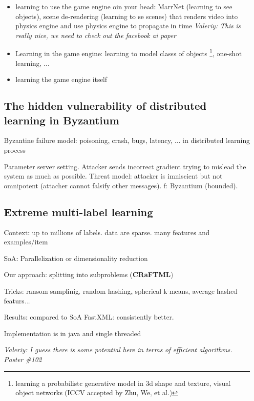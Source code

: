 \documentclass[11pt,oneside,a4paper]{scrartcl}
\newcommand{\valeriy}[1]{{\color{blue}\textit{Valeriy: #1}}}
\begin{document}
\begin{itemize}
\item learning to use the game engine oin your head: MarrNet (learning
  to see objects), scene de-rendering (learning to se scenes) that
  renders video into physics engine and use physics engine to
  propagate in time
  \valeriy{This is really nice, we need to check out the facebook ai paper}
  
\item Learning in the game engine: learning to model classs of objects \footnote{ learning a probabilistc generative
  model in 3d shape and texture, visual object networks (ICCV accepted
  by Zhu, We, et al.) }, one-shot learning, ...
  
\item learning the game engine itself
\end{itemize}

\subsection{The hidden vulnerability of distributed learning in Byzantium \cite{mhamdi18a}}
\label{sec:hidd-vuln-distr}

Byzantine failure model: poisoning, crash, bugs, latency, ... in
distributed learning process

Parameter server setting. Attacker sends incorrect gradient trying to
mislead the system as much as possible. Threat model: attacker is imniscient but not
omnipotent (attacher cannot falsify other messages). f: Byzantium (bounded). 

\subsection{Extreme multi-label learning}
\label{sec:extreme-multi-label}

Context: up to millions of labels. data are sparse. many features and
examples/item

SoA: Parallelization or dimensionality reduction

Our approach: splitting into subproblems (\textbf{CRaFTML})

Tricks: ransom samplinig, random hashing, spherical k-means, average
hashed featurs...

Results: compared to SoA FastXML: consistently better.

Implementation is in java and single threaded

\valeriy{I guess there is some potential here in terms of efficient
  algorithms. Poster \#102}
\end{document}
